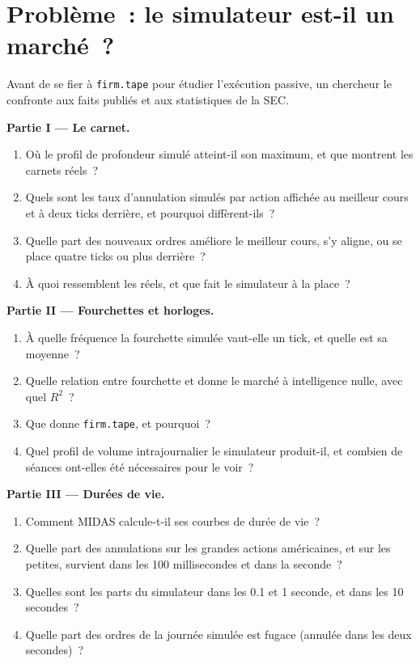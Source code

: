 \section{Problème~: le simulateur est-il un marché~?}

\begin{problem}\label{pb:mx:empirical-facts-of-order-books:1}
Avant de se fier à \texttt{firm.tape} pour étudier l'exécution passive, un chercheur le confronte aux faits publiés et aux statistiques de la SEC.

\medskip\noindent\textbf{Partie I --- Le carnet.}
\begin{enumerate}
\item Où le profil de profondeur simulé atteint-il son maximum, et que montrent les carnets réels~?
\item Quels sont les taux d'annulation simulés par action affichée au meilleur cours et à deux ticks derrière, et pourquoi diffèrent-ils~?
\item Quelle part des nouveaux ordres améliore le meilleur cours, s'y aligne, ou se place quatre ticks ou plus derrière~?
\item À quoi ressemblent les  réels, et que fait le simulateur à la place~?
\end{enumerate}

\medskip\noindent\textbf{Partie II --- Fourchettes et horloges.}
\begin{enumerate}[resume]
\item À quelle fréquence la fourchette simulée vaut-elle un tick, et quelle est sa moyenne~?
\item Quelle relation entre fourchette et  donne le marché à intelligence nulle, avec quel $R^2$~?
\item Que donne \texttt{firm.tape}, et pourquoi~?
\item Quel profil de volume intrajournalier le simulateur produit-il, et combien de séances ont-elles été nécessaires pour le voir~?
\end{enumerate}

\medskip\noindent\textbf{Partie III --- Durées de vie.}
\begin{enumerate}[resume]
\item Comment MIDAS calcule-t-il ses courbes de durée de vie~?
\item Quelle part des annulations sur les grandes actions américaines, et sur les petites, survient dans les 100 millisecondes et dans la seconde~?
\item Quelles sont les parts du simulateur dans les 0.1 et 1 seconde, et dans les 10 secondes~?
\item Quelle part des ordres de la journée simulée est fugace (annulée dans les deux secondes)~?
\end{enumerate}


\end{problem}
